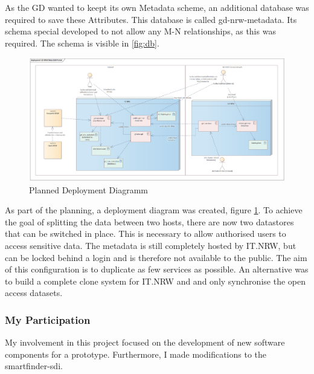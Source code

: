 \documentclass[11pt, titlepage, a4paper]{article}
\begin{document}
As the GD wanted to keept its own Metadata scheme, an additional database was required to save these Attributes.  This database  is called gd-nrw-metadata. Its schema special developed to not allow any M-N relationships, as this was required.  The schema is visible in \ref{fig:db}.


\begin{figure}[t]
	\caption{Planned Deployment Diagramm}
	\label{fig:deployment}
	\includegraphics[width=16cm]{deployment.png}
	\centering
\end{figure}

As part of the planning, a deployment diagram was created, figure \ref{fig:deployment}. To achieve the goal of splitting the data between two hosts, there are now two datastores that can be switched in place. This is necessary to allow authorised users to access sensitive data. The metadata is still completely hosted by IT.NRW, but can be locked behind a login and is therefore not available to the public. The aim of this configuration is to duplicate as few services as possible.
An alternative was to build a complete clone system for IT.NRW and  and only synchronise the open access datasets.

\subsubsection{My Participation}
My involvement in this project focused on the development of new software components for a prototype. Furthermore, I made modifications to the smartfinder-sdi.
\end{document}
